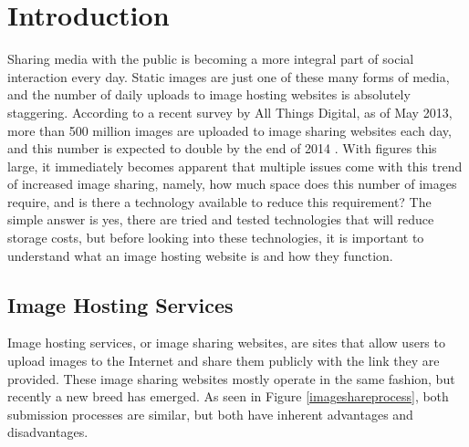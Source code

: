 %
%

\chapter{Introduction}\label{ch:intro} %


Sharing media with the public is becoming a more integral part of social interaction every day. Static images are just one of these many forms of media, and the number of daily uploads to image hosting websites is absolutely staggering. According to a recent survey by All Things Digital, as of May 2013, more than 500 million images are uploaded to image sharing websites each day, and this number is expected to double by the end of 2014 \cite{meek:500}. With figures this large, it immediately becomes apparent that multiple issues come with this trend of increased image sharing, namely, how much space does this number of images require, and is there a technology available to reduce this requirement? The simple answer is yes, there are tried and tested technologies that will reduce storage costs, but before looking into these technologies, it is important to understand what an image hosting website is and how they function.

\section{Image Hosting Services} \label{sec:imagehostingservices}
Image hosting services, or image sharing websites, are sites that allow users to upload images to the Internet and share them publicly with the link they are provided. These image sharing websites mostly operate in the same fashion, but recently a new breed has emerged. As seen in Figure \ref{imageshareprocess}, both submission processes are similar, but both have inherent advantages and disadvantages.

